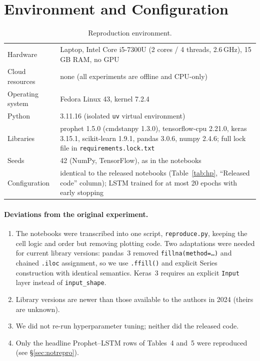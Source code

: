 \documentclass[11pt,a4paper]{article}
\begin{document}
\section{Environment and Configuration}
\begin{table}[h]\centering\small
\caption{Reproduction environment.}\label{tab:env}
\begin{tabularx}{\textwidth}{@{}lL@{}}\toprule
Hardware & Laptop, Intel Core i5-7300U (2 cores / 4 threads, 2.6\,GHz), 15\,GB RAM, no GPU \\
Cloud resources & none (all experiments are offline and CPU-only) \\
Operating system & Fedora Linux 43, kernel 7.2.4 \\
Python & 3.11.16 (isolated \texttt{uv} virtual environment) \\
Libraries & prophet 1.5.0 (cmdstanpy 1.3.0), tensorflow-cpu 2.21.0, keras 3.15.1, scikit-learn 1.9.1, pandas 3.0.6, numpy 2.4.6; full lock file in \texttt{requirements.lock.txt} \\
Seeds & 42 (NumPy, TensorFlow), as in the notebooks \\
Configuration & identical to the released notebooks (Table~\ref{tab:hp}, ``Released code'' column); LSTM trained for at most 20 epochs with early stopping \\
\bottomrule\end{tabularx}
\end{table}

\paragraph{Deviations from the original experiment.}
\begin{enumerate}
\item The notebooks were transcribed into one script, \texttt{reproduce.py}, keeping the cell logic and order but removing plotting code. Two adaptations were needed for current library versions: pandas~3 removed \texttt{fillna(method=\dots)} and chained \texttt{.iloc} assignment, so we use \texttt{.ffill()} and explicit Series construction with identical semantics. Keras~3 requires an explicit \texttt{Input} layer instead of \texttt{input\_shape}.
\item Library versions are newer than those available to the authors in 2024 (theirs are unknown).
\item We did not re-run hyperparameter tuning; neither did the released code.
\item Only the headline Prophet--LSTM rows of Tables~4 and~5 were reproduced (see \S\ref{sec:notrepro}).
\end{enumerate}
\end{document}
